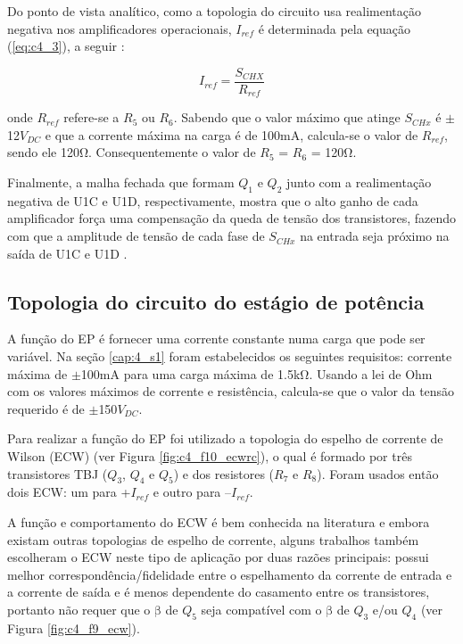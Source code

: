 Do ponto de vista analítico, como a topologia do circuito usa realimentação negativa nos amplificadores operacionais, $I_{ref}$ é determinada pela equação (\ref{eq:c4_3}), a seguir \cite{Kaczmarek1991ASystem}:

\begin{equation}
    I_{ref} = \frac{S_{CHX}}{R_{ref}}
    \label{eq:c4_3}
\end{equation}

onde $R_{ref}$ refere-se a $R_5$ ou $R_6$. Sabendo que o valor máximo que atinge $S_{CHx}$ é $\mathrm{\pm}$12$V_{DC}$ e que a corrente máxima na carga é de 100mA, calcula-se o valor de $R_{ref}$, sendo ele 120$\mathrm{\Omega}$. Consequentemente o valor de $R_5$ = $R_6$ = 120$\mathrm{\Omega}$.

Finalmente, a malha fechada que formam $Q_1$ e $Q_2$ junto com a realimentação negativa de U1C e U1D, respectivamente, mostra que o alto ganho de cada amplificador força uma compensação da queda de tensão dos transistores, fazendo com que a amplitude de tensão de cada fase de $S_{CHx}$ na entrada seja próximo na saída de U1C e U1D \cite{Kaczmarek1991ASystem}.


\subsection*{Topologia do circuito do estágio de potência} 
A função do \acrshort{EP} é fornecer uma corrente constante numa carga que pode ser variável. Na seção \ref{cap:4_s1} foram estabelecidos os seguintes requisitos: corrente máxima de $\mathrm{\pm}$100mA para uma carga máxima de 1.5k$\mathrm{\Omega}$. Usando a lei de Ohm com os valores máximos de corrente e resistência, calcula-se que o valor da tensão requerido é de $\mathrm{\pm}$150$V_{DC}$.

Para realizar a função do \acrshort{EP} foi utilizado a topologia do espelho de corrente de Wilson (\acrshort{ECW}) (ver Figura \ref{fig:c4_f10_ecwrc}), o qual é formado por três transistores \acrshort{TBJ} ($Q_3$, $Q_4$ e $Q_5$) e dos resistores ($R_7$ e $R_8$). Foram usados então dois \acrshort{ECW}: um para +$I_{ref}$ e outro para –$I_{ref}$. 

A função e comportamento do \acrshort{ECW} é bem conhecida na literatura \cite{Boylestad2013DispositivosCircuitos} e embora existam outras topologias de espelho de corrente, alguns trabalhos \cite{Kaczmarek1991ASystem, Wu2002AApplications, Sanches2013SistemaParaplegicos} também escolheram o \acrshort{ECW} neste tipo de aplicação por duas razões principais: possui melhor correspondência/fidelidade entre o espelhamento da corrente de entrada e a corrente de saída e é menos dependente do casamento entre os transistores, portanto não requer que o $\mathrm{\beta}$ de $Q_5$ seja compatível com o $\mathrm{\beta}$ de $Q_3$ e/ou $Q_4$ (ver Figura \ref{fig:c4_f9_ecw}).

